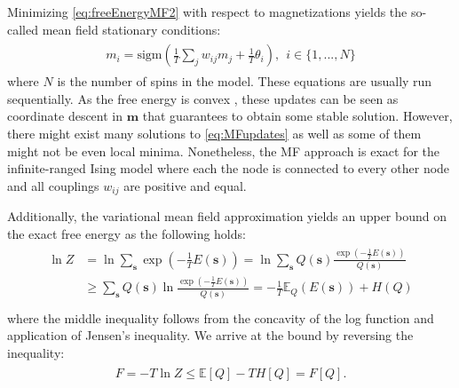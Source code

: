 \documentclass[../report/report.tex]{subfiles}
\begin{document}
Minimizing \ref{eq:freeEnergyMF2} with respect to magnetizations yields the so-called mean field stationary conditions:
\begin{align}
\begin{split}
m_i = \text{sigm}\left(\frac{1}{T}\sum_j w_{ij}m_j + \frac{1}{T} \theta_i \right), ~~ i \in \{1, ..., N\}
\label{eq:MFupdates}
\end{split}
\end{align}
where $N$ is the number of spins in the model. These equations are usually run sequentially. As the free energy is convex \cite{wainwright2008graphical}, these updates can be seen as coordinate descent in $\mathbf{m}$ that guarantees to obtain some stable solution. However, there might exist many solutions to \ref{eq:MFupdates} as well as some of them might not be even local minima. Nonetheless, the MF approach is exact for the infinite-ranged Ising model where each the node is connected to every other node and all couplings $w_{ij}$ are positive and equal\cite{kirkpatrick1978infinite}.

Additionally, the variational mean field approximation yields an upper bound on the exact free energy as the following holds:
\begin{align}
\begin{split}
\ln Z & = \ln \sum_{\mathbf{s}} \exp(-\frac{1}{T}E(\mathbf{s}))= \ln  \sum_{\mathbf{s}} Q(\mathbf{s}) \frac{ \exp(-\frac{1}{T}E(\mathbf{s}))}{Q(\mathbf{s})} \\
& \geqslant  \sum_{\mathbf{s}} Q(\mathbf{s}) \ln  \frac{ \exp(-\frac{1}{T}E(\mathbf{s}))}{Q(\mathbf{s})} = -\frac{1}{T}\mathbb{E}_Q(E(\mathbf{s})) + H(Q)\\
\end{split}
\end{align}
where the middle inequality follows from the concavity of the log function and application of Jensen's inequality. We arrive at the bound by reversing the inequality:
\begin{align}
\begin{split}
F = - T \ln Z \leqslant \mathbb{E}[Q] - TH[Q] = F[Q].
\end{split}
\end{align}
\end{document}
